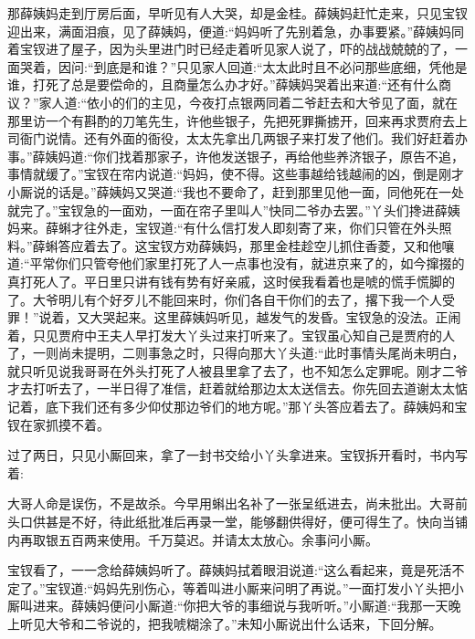 \begin{parag}
    那薛姨妈走到厅房后面，早听见有人大哭，却是金桂。薛姨妈赶忙走来，只见宝钗迎出来，满面泪痕，见了薛姨妈，便道:“妈妈听了先别着急，办事要紧。”薛姨妈同着宝钗进了屋子，因为头里进门时已经走着听见家人说了，吓的战战兢兢的了，一面哭着，因问:“到底是和谁？”只见家人回道:“太太此时且不必问那些底细，凭他是谁，打死了总是要偿命的，且商量怎么办才好。”薛姨妈哭着出来道:“还有什么商议？”家人道:“依小的们的主见，今夜打点银两同着二爷赶去和大爷见了面，就在那里访一个有斟酌的刀笔先生，许他些银子，先把死罪撕掳开，回来再求贾府去上司衙门说情。还有外面的衙役，太太先拿出几两银子来打发了他们。我们好赶着办事。”薛姨妈道:“你们找着那家子，许他发送银子，再给他些养济银子，原告不追，事情就缓了。”宝钗在帘内说道:“妈妈，使不得。这些事越给钱越闹的凶，倒是刚才小厮说的话是。”薛姨妈又哭道:“我也不要命了，赶到那里见他一面，同他死在一处就完了。”宝钗急的一面劝，一面在帘子里叫人”快同二爷办去罢。”丫头们搀进薛姨妈来。薛蝌才往外走，宝钗道:“有什么信打发人即刻寄了来，你们只管在外头照料。”薛蝌答应着去了。这宝钗方劝薛姨妈，那里金桂趁空儿抓住香菱，又和他嚷道:“平常你们只管夸他们家里打死了人一点事也没有，就进京来了的，如今撺掇的真打死人了。平日里只讲有钱有势有好亲戚，这时侯我看着也是唬的慌手慌脚的了。大爷明儿有个好歹儿不能回来时，你们各自干你们的去了，撂下我一个人受罪！”说着，又大哭起来。这里薛姨妈听见，越发气的发昏。宝钗急的没法。正闹着，只见贾府中王夫人早打发大丫头过来打听来了。宝钗虽心知自己是贾府的人了，一则尚未提明，二则事急之时，只得向那大丫头道:“此时事情头尾尚未明白，就只听见说我哥哥在外头打死了人被县里拿了去了，也不知怎么定罪呢。刚才二爷才去打听去了，一半日得了准信，赶着就给那边太太送信去。你先回去道谢太太惦记着，底下我们还有多少仰仗那边爷们的地方呢。”那丫头答应着去了。薛姨妈和宝钗在家抓摸不着。
\end{parag}


\begin{parag}
    过了两日，只见小厮回来，拿了一封书交给小丫头拿进来。宝钗拆开看时，书内写着:
\end{parag}


\begin{qute2sp}
    大哥人命是误伤，不是故杀。今早用蝌出名补了一张呈纸进去，尚未批出。大哥前头口供甚是不好，待此纸批准后再录一堂，能够翻供得好，便可得生了。快向当铺内再取银五百两来使用。千万莫迟。并请太太放心。余事问小厮。
\end{qute2sp}


\begin{parag}
    宝钗看了，一一念给薛姨妈听了。薛姨妈拭着眼泪说道:“这么看起来，竟是死活不定了。”宝钗道:“妈妈先别伤心，等着叫进小厮来问明了再说。”一面打发小丫头把小厮叫进来。薛姨妈便问小厮道:“你把大爷的事细说与我听听。”小厮道:“我那一天晚上听见大爷和二爷说的，把我唬糊涂了。”未知小厮说出什么话来，下回分解。
\end{parag}